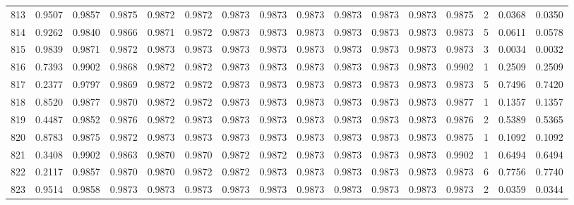 \begin{tabular}{lrrrrrrrrrrrrrrr}
813 &      0.9507 &  0.9857 &  0.9875 &  0.9872 &  0.9872 &  0.9873 &  0.9873 &  0.9873 &  0.9873 &  0.9873 &   0.9873 &     0.9875 &      2 &                    0.0368 &                     0.0350 \\
814 &      0.9262 &  0.9840 &  0.9866 &  0.9871 &  0.9872 &  0.9873 &  0.9873 &  0.9873 &  0.9873 &  0.9873 &   0.9873 &     0.9873 &      5 &                    0.0611 &                     0.0578 \\
815 &      0.9839 &  0.9871 &  0.9872 &  0.9873 &  0.9873 &  0.9873 &  0.9873 &  0.9873 &  0.9873 &  0.9873 &   0.9873 &     0.9873 &      3 &                    0.0034 &                     0.0032 \\
816 &      0.7393 &  0.9902 &  0.9868 &  0.9872 &  0.9872 &  0.9873 &  0.9873 &  0.9873 &  0.9873 &  0.9873 &   0.9873 &     0.9902 &      1 &                    0.2509 &                     0.2509 \\
817 &      0.2377 &  0.9797 &  0.9869 &  0.9872 &  0.9872 &  0.9873 &  0.9873 &  0.9873 &  0.9873 &  0.9873 &   0.9873 &     0.9873 &      5 &                    0.7496 &                     0.7420 \\
818 &      0.8520 &  0.9877 &  0.9870 &  0.9872 &  0.9872 &  0.9873 &  0.9873 &  0.9873 &  0.9873 &  0.9873 &   0.9873 &     0.9877 &      1 &                    0.1357 &                     0.1357 \\
819 &      0.4487 &  0.9852 &  0.9876 &  0.9872 &  0.9873 &  0.9873 &  0.9873 &  0.9873 &  0.9873 &  0.9873 &   0.9873 &     0.9876 &      2 &                    0.5389 &                     0.5365 \\
820 &      0.8783 &  0.9875 &  0.9872 &  0.9873 &  0.9873 &  0.9873 &  0.9873 &  0.9873 &  0.9873 &  0.9873 &   0.9873 &     0.9875 &      1 &                    0.1092 &                     0.1092 \\
821 &      0.3408 &  0.9902 &  0.9863 &  0.9870 &  0.9870 &  0.9872 &  0.9872 &  0.9873 &  0.9873 &  0.9873 &   0.9873 &     0.9902 &      1 &                    0.6494 &                     0.6494 \\
822 &      0.2117 &  0.9857 &  0.9870 &  0.9870 &  0.9872 &  0.9872 &  0.9873 &  0.9873 &  0.9873 &  0.9873 &   0.9873 &     0.9873 &      6 &                    0.7756 &                     0.7740 \\
823 &      0.9514 &  0.9858 &  0.9873 &  0.9873 &  0.9873 &  0.9873 &  0.9873 &  0.9873 &  0.9873 &  0.9873 &   0.9873 &     0.9873 &      2 &                    0.0359 &                     0.0344 \\

\end{tabular}
